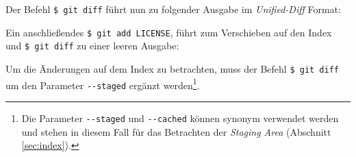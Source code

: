 
Der Befehl \texttt{\$ git diff} führt nun zu folgender Ausgabe im \textit{Unified-Diff}
Format:


Ein anschließendes \texttt{\$ git add LICENSE}, führt zum Verschieben auf den
Index und \texttt{\$ git diff} zu einer leeren Ausgabe:


Um die Änderungen auf dem Index zu betrachten, muss der Befehl \texttt{\$ git
diff} um den Parameter \texttt{-{}-{}staged} ergänzt werden\footnote{Die Parameter
\texttt{-{}-{}staged} und \texttt{-{}-{}cached} können synonym verwendet
werden und stehen in diesem Fall für das Betrachten der \textit{Staging
Area} (Abschnitt \ref{sec:index}).}. \cite[26-29]{progit}
